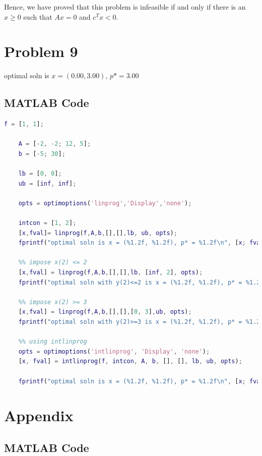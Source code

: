 \documentclass[12pt]{article}
\begin{document}
Hence, we have proved that this problem is infeasible if and only if there is an  $x \geq 0$ such that  $Ax=0$ and  $c^T x<0$.


\clearpage
\section{Problem 9}

optimal soln is $x = (0.00, 3.00)$, $p* = 3.00$

\subsection{MATLAB Code}



\begin{lstlisting}[language=Matlab, basicstyle=\scriptsize]
    f = [1, 1];

    A = [-2, -2; 12, 5];
    b = [-5; 30];
    
    lb = [0, 0];
    ub = [inf, inf];
    
    opts = optimoptions('linprog','Display','none');
    
    intcon = [1, 2];
    [x,fval]= linprog(f,A,b,[],[],lb, ub, opts);
    fprintf("optimal soln is x = (%1.2f, %1.2f), p* = %1.2f\n", [x; fval]) 
    
    %% impose x(2) <= 2
    [x,fval] = linprog(f,A,b,[],[],lb, [inf, 2], opts);
    fprintf("optimal soln with y(2)<=2 is x = (%1.2f, %1.2f), p* = %1.2f\n", [x; fval]) 
    
    %% impose x(2) >= 3
    [x,fval] = linprog(f,A,b,[],[],[0, 3],ub, opts);
    fprintf("optimal soln with y(2)>=3 is x = (%1.2f, %1.2f), p* = %1.2f\n", [x; fval]) 
    
    %% using intlinprog
    opts = optimoptions('intlinprog', 'Display', 'none');
    [x, fval] = intlinprog(f, intcon, A, b, [], [], lb, ub, opts);
    
    fprintf("optimal soln is x = (%1.2f, %1.2f), p* = %1.2f\n", [x; fval]) 
\end{lstlisting}

\clearpage

\appendix
\section*{Appendix}
\renewcommand{\thesubsection}{\Alph{subsection}}

\subsection{MATLAB Code}
\end{document}
